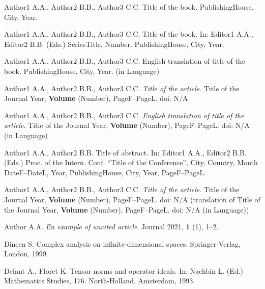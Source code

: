 \documentclass[12pt,twoside,draft]{cmpart}
\begin{document}
\begin{thebibliography}{999}

 Author1 A.A., Author2 B.B., Author3 C.C. Title of the book. PublishingHouse, City, Year.

 Author1 A.A., Author2 B.B., Author3 C.C. Title of the book. In: Editor1 A.A.,
Editor2 B.B. (Eds.)
SeriesTitle, Number. PublishingHouse, City, Year.

 Author1 A.A., Author2 B.B., Author3 C.C. English translation of title of the
book.
PublishingHouse, City, Year. (in Language)

 Author1 A.A., Author2 B.B., Author3 C.C. \emph{Title of the article}.
Title of the Journal Year, \textbf{Volume} (Number), PageF--PageL.
doi: N/A

 Author1 A.A., Author2 B.B., Author3 C.C. \emph{English translation of title
of the article}. Title of the Journal Year, \textbf{Volume} (Number), PageF--PageL.
doi: N/A (in Language)

 Author1 A.A., Author2 B.B. Title of abstract. In: Editor1 A.A., Editor2 B.B.
(Eds.) Proc. of the Intern. Conf.
``Title of the Conference'', City, Country, Month DateF--DateL, Year, PublishingHouse, City, Year, PageF--PageL.

 Author1 A.A., Author2 B.B., Author3 C.C. \emph {Title of the article}.
Title of the Journal Year, \textbf{Volume} (Number), PageF--PageL. doi: N/A
(translation of Title of the Journal Year, \textbf{Volume} (Number),
PageF--PageL. doi: N/A (in Language))


 Author A.A. \textit{En example of uncited article}. Journal 2021, \textbf{1} (1), 1--2.


 Dineen S. Complex analysis on infinite-dimensional spaces.
 Springer-Verlag, London, 1999.

 Defant A., Floret K. Tensor norms and operator ideals.
In: Nachbin L. (Ed.) Mathematics Studies, 176.
North-Holland, Amsterdam, 1993.


\end{thebibliography}
\end{document}
